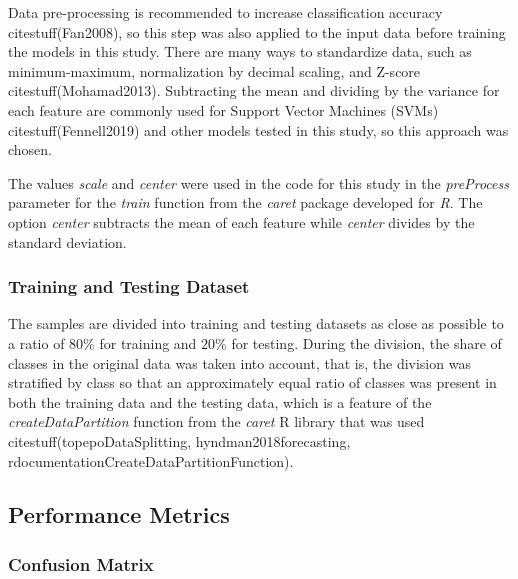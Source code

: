 \documentclass[preprint,12pt]{elsarticle}
\begin{document}
Data pre-processing is recommended to increase classification accuracy citestuff(Fan2008), so this step was also applied to the input data before training the models in this study. There are many ways to standardize data, such as minimum-maximum, normalization by decimal scaling, and Z-score citestuff(Mohamad2013). Subtracting the mean and dividing by the variance for each feature are commonly used for Support Vector Machines (SVMs) citestuff(Fennell2019) and other models tested in this study, so this approach was chosen. 

The values \textit{scale} and \textit{center} were used in the code for this study in the \textit{preProcess} parameter for the \textit{train} function from the \textit{caret} package developed for \textit{R}. The option \textit{center} subtracts the mean of each feature while \textit{center} divides by the standard deviation. 

\subsubsection{Training and Testing Dataset}

The samples are divided into training and testing datasets as close as possible to a ratio of $80\%$ for training and $20\%$ for testing. During the division, the share of classes in the original data was taken into account, that is, the division was stratified by class so that an approximately equal ratio of classes was present in both the training data and the testing data, which is a feature of the \textit{createDataPartition} function from the \textit{caret} R library that was used citestuff(topepoDataSplitting, hyndman2018forecasting, rdocumentationCreateDataPartitionFunction).

\subsection{Performance Metrics}

\subsubsection{Confusion Matrix}
\end{document}
